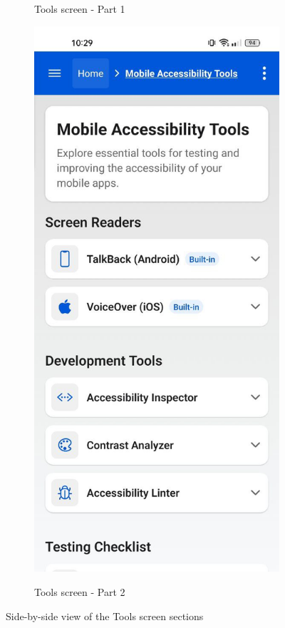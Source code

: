 \begin{figure}[ht]
\begin{subfigure}[b]{0.48\textwidth}
        \caption{Tools screen - Part 1}
        \label{fig:tools-left}
    \end{subfigure}
    \hfill
    \begin{subfigure}[b]{0.48\textwidth}
        \centering
        \includegraphics[width=\linewidth, alt={Second part of the Tools Screen}]{img/tools2.jpg}
        \caption{Tools screen - Part 2}
        \label{fig:tools-right}
    \end{subfigure}
    \caption{Side-by-side view of the Tools screen sections}
    \label{fig:tools_screens_sidebyside}
\end{figure}

